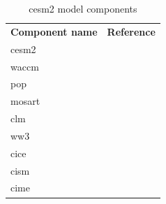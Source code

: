 \documentclass[twocol]{ametsocV5}
\begin{document}
\begin{table}
  \caption{\acrshort{cesm2} model components}%
  \label{tab:cesm-components}
  \begin{center}
    \begin{tabular}[c]{ll}
      \multicolumn{1}{c}{\textbf{Component name}} &
      \multicolumn{1}{c}{\textbf{Reference}}                                              \\
      \acrlong{cesm2}                             & \citet{danabasoglu2020}               \\
      \acrlong{waccm}                             & \citet{gettleman2019}                 \\
      \acrlong{pop}                               & \citet{smith2010, danabasoglu2020}    \\
      \acrlong{mosart}                            & \citet{li2013, danabasoglu2020}       \\
      \acrlong{clm}                               & \citet{lawrence2019, danabasoglu2020} \\
      \acrlong{ww3}                               & \citet{danabasoglu2020}               \\
      \acrlong{cice}                              & \citet{danabasoglu2020}               \\
      \acrlong{cism}                              & \citet{danabasoglu2020}               \\
      \acrlong{cime}                              & \citet{danabasoglu2020}
    \end{tabular}
  \end{center}
\end{table}
\end{document}
